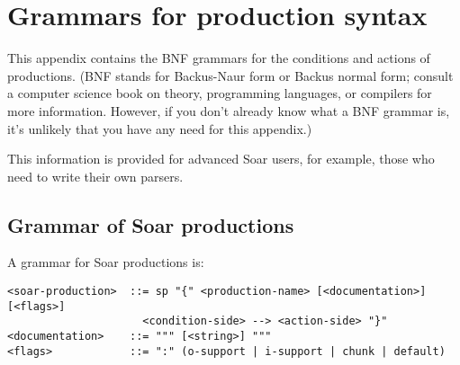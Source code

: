 \chapter{Grammars for production syntax}
\label{GRAMMARS}

This appendix contains the BNF grammars for the conditions and actions of
productions. (BNF stands for Backus-Naur form or Backus normal form; consult a
computer science book on theory, programming languages, or compilers for more
information. However, if you don't already know what a BNF grammar is, it's
unlikely that you have any need for this appendix.)

This information is provided for advanced Soar users, for example, those who
need to write their own parsers.




\section{Grammar of Soar productions}

A grammar for Soar productions is:
\begin{verbatim}
<soar-production>  ::= sp "{" <production-name> [<documentation>] [<flags>]
                     <condition-side> --> <action-side> "}"
<documentation>    ::= """ [<string>] """
<flags>            ::= ":" (o-support | i-support | chunk | default)
\end{verbatim}


